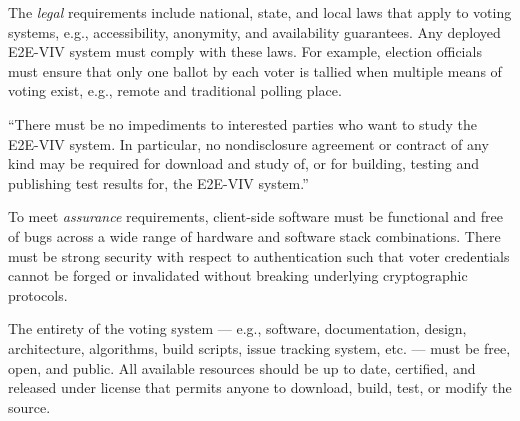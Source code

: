 The \emph{legal} requirements include national, state, and local laws that apply
to voting systems, e.g., accessibility, anonymity, and availability guarantees.
Any deployed E2E-VIV system must comply with these laws. For example, election
officials must ensure that only one ballot by each voter is tallied when
multiple means of voting exist, e.g., remote and traditional polling place.
%
%
\begin{displayquote}
  ``There must be no impediments to interested parties who want to study the
  E2E-VIV system. In particular, no nondisclosure agreement or contract of any
  kind may be required for download and study of, or for building, testing and
  publishing test results for, the E2E-VIV system.''\cite{e2e-viv}
\end{displayquote}

To meet \emph{assurance} requirements, client-side software must be functional
and free of bugs across a wide range of hardware and software stack
combinations. There must be strong security with respect to authentication such
that voter credentials cannot be forged or invalidated without breaking
underlying cryptographic protocols.

The entirety of the voting system --- e.g., software, documentation, design,
architecture, algorithms, build scripts, issue tracking system, etc. --- must be
free, open, and public. All available resources should be up to date, certified,
and released under license that permits anyone to download, build, test, or
modify the source.


